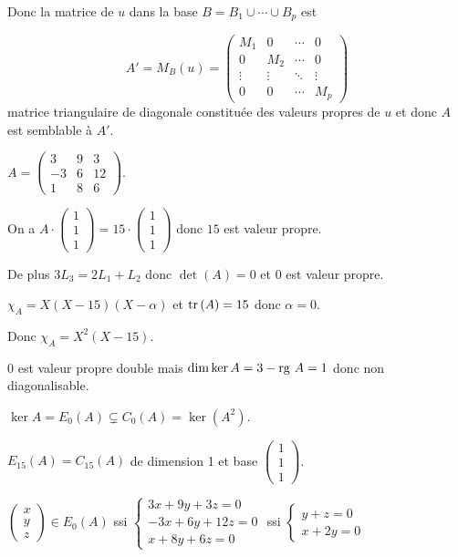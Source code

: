 Donc la matrice de $u$ dans la base $B = B_1 \cup \cdots \cup B_p$ est 

$$A' = M_B(u) = \begin{pmatrix}
    M_1 & 0 & \cdots & 0 \\
    0 & M_2 & \cdots & 0 \\
    \vdots & \vdots & \ddots & \vdots \\
    0 & 0 & \cdots & M_p
\end{pmatrix}$$ matrice triangulaire de diagonale constituée des valeurs propres de $u$
et donc $A$ est semblable à $A'$. 

\begin{exemple}
    $A = \begin{pmatrix}
        3 & 9 & 3 \\
        -3 & 6 & 12 \\
        1 & 8 & 6
    \end{pmatrix}$.

    On a $A \cdot \begin{pmatrix}
        1 \\ 1 \\ 1
    \end{pmatrix} = 15 \cdot \begin{pmatrix}
        1 \\ 1 \\ 1
    \end{pmatrix}$ donc $15$ est valeur propre.

    De plus $3 L_3 = 2 L_1 + L_2$ donc $\det(A) = 0$ et $0$ est valeur propre.

    $\chi_A = X(X - 15)(X - \alpha)$ et $\operatorname{tr} \,(A) = 15$ donc $\alpha = 0$.

    Donc $\chi_A = X^2 (X - 15)$. 

    $0$ est valeur propre double mais $\dim \ker A = 3 - \operatorname{rg} \, A = 1$ donc non diagonalisable.

    $\ker A = E_0(A) \subsetneq C_0(A) = \ker (A^2)$.

    $E_{15}(A) = C_{15}(A)$ de dimension 1 et base $\begin{pmatrix}
        1 \\ 1 \\ 1
    \end{pmatrix}$.

    $\begin{pmatrix}
        x \\ y \\ z
    \end{pmatrix} \in E_0(A)$ ssi $\begin{cases}
        3x + 9y + 3z = 0 \\
        -3x + 6y + 12z = 0 \\
        x + 8y + 6z = 0
    \end{cases}$ ssi $\begin{cases}
        y + z = 0 \\
        x + 2y = 0
    \end{cases}$


\end{exemple}
